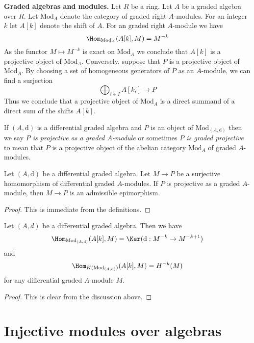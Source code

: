 \medskip\noindent
{\bf Graded algebras and modules.}
Let $R$ be a ring. Let $A$ be a graded algebra over $R$.
Let $\text{Mod}_A$ denote the category of graded right $A$-modules.
For an integer $k$ let $A[k]$ denote the shift of $A$.
For an graded right $A$-module we have
$$
\Hom_{\text{Mod}_A}(A[k], M) = M^{-k}
$$
As the functor $M \mapsto M^{-k}$ is exact on $\text{Mod}_A$ we
conclude that $A[k]$ is a projective object of $\text{Mod}_A$.
Conversely, suppose that $P$ is a projective object of $\text{Mod}_A$.
By choosing a set of homogeneous generators of $P$ as an $A$-module,
we can find a surjection
$$
\bigoplus\nolimits_{i \in I} A[k_i] \longrightarrow P
$$
Thus we conclude that a projective object of $\text{Mod}_A$ is
a direct summand of a direct sum of the shifts $A[k]$.

\medskip\noindent
If $(A, \text{d})$ is a differential graded algebra and $P$ is
an object of $\text{Mod}_{(A, \text{d})}$ then we say
{\it $P$ is projective as a graded $A$-module} or sometimes
{\it $P$ is graded projective} to mean
that $P$ is a projective object of the abelian category $\text{Mod}_A$
of graded $A$-modules.

\begin{lemma}
\label{lemma-target-graded-projective}
Let $(A, \text{d})$ be a differential graded algebra.
Let $M \to P$ be a surjective homomorphism of differential graded
$A$-modules. If $P$ is projective as a graded $A$-module, then
$M \to P$ is an admissible epimorphism.
\end{lemma}

\begin{proof}
This is immediate from the definitions.
\end{proof}

\begin{lemma}
\label{lemma-hom-from-shift-free}
Let $(A, d)$ be a differential graded algebra. Then we have
$$
\Hom_{\text{Mod}_{(A, \text{d})}}(A[k], M) =
\Ker(\text{d} : M^{-k} \to M^{-k + 1})
$$
and
$$
\Hom_{K(\text{Mod}_{(A, \text{d})})}(A[k], M) = H^{-k}(M)
$$
for any differential graded $A$-module $M$.
\end{lemma}

\begin{proof}
This is clear from the discussion above.
\end{proof}







\section{Injective modules over algebras}
\label{section-modules-noncommutative}

